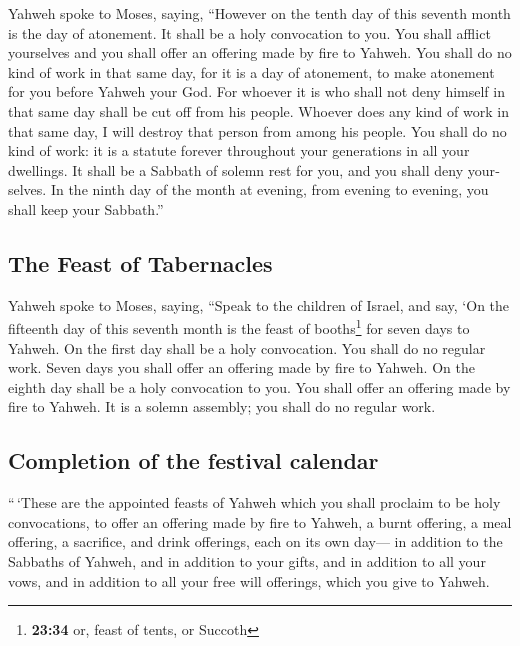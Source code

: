 \begin{paracol}{2}
\begin{otherlanguage}{english}
 Yahweh spoke to Moses, saying,  ``However
on the tenth day of this seventh month is the day of atonement. It shall
be a holy convocation to you. You shall afflict yourselves and you shall
offer an offering made by fire to Yahweh.  You shall do
no kind of work in that same day, for it is a day of atonement, to make
atonement for you before Yahweh your God.  For whoever it
is who shall not deny himself in that same day shall be cut off from his
people.  Whoever does any kind of work in that same day,
I will destroy that person from among his people.  You
shall do no kind of work: it is a statute forever throughout your
generations in all your dwellings.  It shall be a Sabbath
of solemn rest for you, and you shall deny yourselves. In the ninth day
of the month at evening, from evening to evening, you shall keep your
Sabbath.''

\hypertarget{the-feast-of-tabernacles}{%
\subsection{The Feast of Tabernacles}\label{the-feast-of-tabernacles}}

 Yahweh spoke to Moses, saying,  ``Speak
to the children of Israel, and say, `On the fifteenth day of this
seventh month is the feast of booths\footnote{\textbf{23:34} or, feast
  of tents, or Succoth} for seven days to Yahweh.  On the
first day shall be a holy convocation. You shall do no regular work.
 Seven days you shall offer an offering made by fire to
Yahweh. On the eighth day shall be a holy convocation to you. You shall
offer an offering made by fire to Yahweh. It is a solemn assembly; you
shall do no regular work.

\hypertarget{completion-of-the-festival-calendar}{%
\subsection{Completion of the festival
calendar}\label{completion-of-the-festival-calendar}}

 ``\,`These are the appointed feasts of Yahweh which you
shall proclaim to be holy convocations, to offer an offering made by
fire to Yahweh, a burnt offering, a meal offering, a sacrifice, and
drink offerings, each on its own day---  in addition to
the Sabbaths of Yahweh, and in addition to your gifts, and in addition
to all your vows, and in addition to all your free will offerings, which
you give to Yahweh.


\end{otherlanguage}
\end{paracol}
